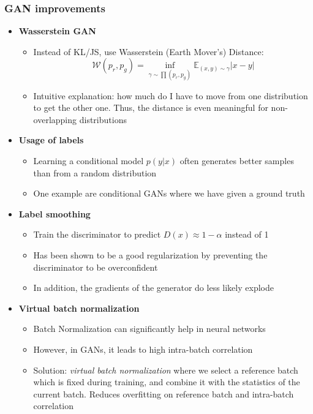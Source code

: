 \subsubsection{GAN improvements}
\begin{itemize}
	\item \textbf{Wasserstein GAN}
	\begin{itemize}
		\item Instead of KL/JS, use Wasserstein (Earth Mover's) Distance:
		$$\mathcal{W}(p_r, p_g) = \inf\limits_{\gamma \sim \prod (p_r,p_g)} \mathbb{E}_{(x,y)\sim \gamma}|x-y|$$
		\item Intuitive explanation: how much do I have to move from one distribution to get the other one. Thus, the distance is even meaningful for non-overlapping distributions
	\end{itemize}
	\item \textbf{Usage of labels}
	\begin{itemize}
		\item Learning a conditional model $p(y|x)$ often generates better samples than from a random distribution
		\item One example are conditional GANs where we have given a ground truth
	\end{itemize}
	\item \textbf{Label smoothing}
	\begin{itemize}
		\item Train the discriminator to predict $D(x)\approx 1 - \alpha$ instead of 1
		\item Has been shown to be a good regularization by preventing the discriminator to be overconfident
		\item In addition, the gradients of the generator do less likely explode
	\end{itemize}
	\item \textbf{Virtual batch normalization}
	\begin{itemize}
		\item Batch Normalization can significantly help in neural networks
		\item However, in GANs, it leads to high intra-batch correlation
		\item Solution: \textit{virtual batch normalization} where we select a reference batch which is fixed during training, and combine it with the statistics of the current batch. Reduces overfitting on reference batch and intra-batch correlation
	\end{itemize}
\end{itemize}
